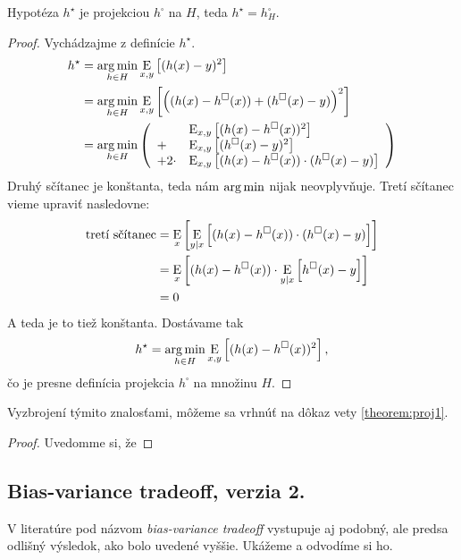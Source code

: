 \begin{lemma}
  Hypotéza $h^\star$ je projekciou $h^\square$ na $H$, teda $h^\star = h^\square_H$.
\end{lemma}
\begin{proof}
  Vychádzajme z definície $h^\star$.
  \begin{align}
    h^\star
      &= \operatorname*{arg\,min}_{h \in H} \operatorname*{\mathrm{E}}_{x,y} \left[ (h(x) - y)^2 \right] \\
      &= \operatorname*{arg\,min}_{h \in H} \operatorname*{\mathrm{E}}_{x,y} \left[ \left( (h(x) - h^\square(x)) + (h^\square(x) - y) \right)^2 \right] \\
      &= \operatorname*{arg\,min}_{h \in H} \left(
        \begin{array}{ll}
          &\operatorname*{\mathrm{E}}_{x,y} \left[ (h(x) - h^\square(x))^2 \right] \\
          + &\operatorname*{\mathrm{E}}_{x,y} \left[ (h^\square(x) - y)^2 \right] \\
          + 2 \cdot &\operatorname*{\mathrm{E}}_{x,y} \left[ (h(x) - h^\square(x)) \cdot (h^\square(x) - y) \right]
        \end{array}
        \right)
  \end{align}
  Druhý sčítanec je konštanta, teda nám $\operatorname*{arg\,min}$ nijak neovplyvňuje.
  Tretí sčítanec vieme upraviť nasledovne:
  \begin{align}
    \text{tretí sčítanec}
      &= \operatorname*{\mathrm{E}}_x \left[ \operatorname*{\mathrm{E}}_{y|x} \left[ (h(x) - h^\square(x)) \cdot (h^\square(x) - y) \right] \right] \\
      &= \operatorname*{\mathrm{E}}_x \left[ (h(x) - h^\square(x)) \cdot \operatorname*{\mathrm{E}}_{y|x} \left[ h^\square(x) - y \right] \right] \\
      &= 0
  \end{align}
  A teda je to tiež konštanta. Dostávame tak
  $$h^\star = \operatorname*{arg\,min}_{h \in H} \operatorname*{\mathrm{E}}_{x,y} \left[ (h(x) - h^\square(x))^2 \right],$$
  čo je presne definícia projekcia $h^\square$ na množinu $H$.
\end{proof}



Vyzbrojení týmito znalosťami, môžeme sa vrhnúť na dôkaz vety \ref{theorem:proj1}.

\begin{proof}
  Uvedomme si, že
\end{proof}



\subsection{Bias-variance tradeoff, verzia 2.}
V literatúre pod názvom \emph{bias-variance tradeoff} vystupuje aj
podobný, ale predsa odlišný výsledok, ako bolo uvedené vyššie.
Ukážeme a odvodíme si ho.

